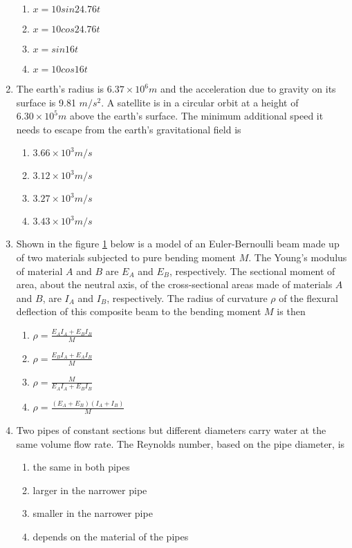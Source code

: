 \documentclass[journal]{IEEEtran}
\begin{document}
\begin{enumerate}
     \begin{enumerate}
         \item $x=10sin24.76t$
         \item $x=10cos24.76t$
         \item $x=sin16t$
         \item $x=10cos16t$
     \end{enumerate}
     \item The earth's radius is $6.37\times10^{6}m$ and the acceleration due to gravity on its surface is 9.81 $m/s^{2}$. A satellite is in a circular orbit at a height of $6.30\times10^{5}m$ above the earth's surface. The minimum additional speed it needs to escape from the earth's gravitational field is
     \begin{enumerate}
         \item $3.66\times10^{3}m/s$
         \item $3.12\times10^{3}m/s$
         \item $3.27\times10^{3}m/s$
         \item $3.43\times10^{3}m/s$
      \end{enumerate}
      \item Shown in the figure \ref{25} below is a model of an Euler-Bernoulli beam made up of two materials subjected to pure bending moment $M$. The Young's modulus of material $A$ and $B$ are $E_A$ and $E_B$, respectively. The sectional moment of area, about the neutral axis, of the cross-sectional areas made of materials $A$ and $B$, are $I_A$ and $I_B$, respectively. The radius of curvature $\rho$ of the flexural deflection of this composite beam to the bending moment $M$ is then

		\begin{figure}[H]
			\centering
			
			\caption{}
			\label{25}
		\end{figure}


		\begin{enumerate}
    			\item $ \rho = \frac{E_A I_A + E_B I_B}{M} $
   			\item $ \rho = \frac{E_B I_A + E_A I_B}{M} $
  			\item $ \rho = \frac{M}{E_A I_A + E_B I_B} $
  			\item $ \rho = \frac{(E_A + E_B)(I_A + I_B)}{M} $
		\end{enumerate}


	\item Two pipes of constant sections but different diameters carry water at the same volume flow rate. The Reynolds number, based on the pipe diameter, is
		\begin{enumerate}
    			\item the same in both pipes
    			\item larger in the narrower pipe
    			\item smaller in the narrower pipe
    			\item depends on the material of the pipes
		\end{enumerate}


\end{enumerate}
\end{document}
